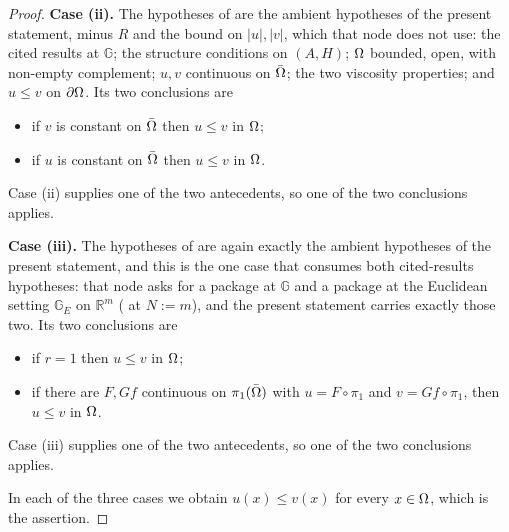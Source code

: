 \begin{proof}
\medskip\noindent\textbf{Case (ii).} The hypotheses of  are the
ambient hypotheses of the present statement, minus $R$ and the bound on $|u|,|v|$, which that
node does not use: the cited results at $\mathbb G$; the structure conditions on $(A,H)$;
$\Omega$ bounded,
open, with non-empty complement; $u,v$ continuous on $\bar{\Omega}$; the two viscosity properties;
and $u\le v$ on $\partial\Omega$. Its two conclusions are
\begin{itemize}
\item if $v$ is constant on $\bar{\Omega}$ then $u\le v$ in $\Omega$;
\item if $u$ is constant on $\bar{\Omega}$ then $u\le v$ in $\Omega$.
\end{itemize}
Case (ii) supplies one of the two antecedents, so one of the two conclusions applies.

\medskip\noindent\textbf{Case (iii).} The hypotheses of  are
again exactly the ambient hypotheses of the present statement, and this is the one case that
consumes both cited-results hypotheses: that node asks for a package at $\mathbb G$ and a
package at the Euclidean setting $\mathbb G_E$ on $\mathbb R^{m}$ ( at
$N:=m$), and the present statement carries exactly those two. Its two conclusions are
\begin{itemize}
\item if $r=1$ then $u\le v$ in $\Omega$;
\item if there are $F,Gf$ continuous on $\pi_1(\bar{\Omega})$ with $u=F\circ\pi_1$ and
  $v=Gf\circ\pi_1$, then $u\le v$ in $\Omega$.
\end{itemize}
Case (iii) supplies one of the two antecedents, so one of the two conclusions applies.

\medskip\noindent In each of the three cases we obtain $u(x)\le v(x)$ for every $x\in\Omega$,
which is the assertion.
\end{proof}
